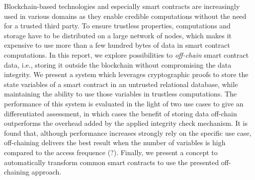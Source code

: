 Blockchain-based technologies and especially smart contracts are increasingly used in various domains as they enable credible computations without the need for a trusted third party.
To ensure trustless properties, computations and storage have to be distributed on a large network of nodes, which makes it expensive to use more than a few hundred bytes of data in smart contract computations.
In this report, we explore possibilities to \emph{off-chain} smart contract data, i.e., storing it outside the blockchain without compromising the data integrity.
We present a system which leverages cryptographic proofs to store the state variables of a smart contract in an untrusted relational database, while maintaining the ability to use those variables in trustless computations.
The performance of this system is evaluated in the light of two use cases to give an differentiated assessment, in which cases the benefit of storing data off-chain outperforms the overhead added by the applied integrity check mechanism.
It is found that, although performance increases strongly rely on the specific use case, off-chaining delivers the best result when the number of variables is high compared to the access frequence (?).
Finally, we present a concept to automatically transform common smart contracts to use the presented off-chaining approach.
